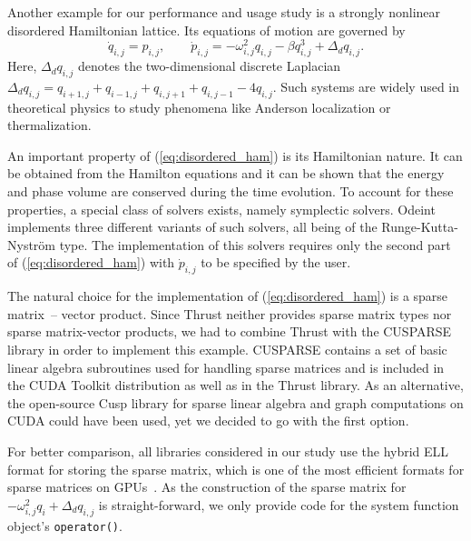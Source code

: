 \documentclass[final]{siamltex}
\newcommand{\code}[1]{\lstinline|#1|}
\newcommand{\eqref}[1]{(\ref{#1})}
\begin{document}
Another example for our performance and usage study is a strongly
nonlinear disordered Hamiltonian lattice. Its equations of motion are
governed by
\begin{equation}
\dot{q}_{i,j} = p_{i,j}, \quad \quad 
\dot{p}_{i,j} = - \omega_{i,j}^2 q_{i,j} - \beta q_{i,j}^3 + \Delta_d q_{i,j}.
\label{eq:disordered_ham}
\end{equation}
Here, $\Delta_d q_{i,j}$ denotes the two-dimensional discrete Laplacian
$\Delta_d
q_{i,j}=q_{i+1,j}+q_{i-1,j}+q_{i,j+1}+q_{i,j-1}-4q_{i,j}$. Such
systems are widely used in theoretical physics to study phenomena
like Anderson localization or thermalization.  %

An important property of \eqref{eq:disordered_ham} is its Hamiltonian
nature. It can be obtained from the Hamilton equations and it can be
shown that the energy and phase volume are conserved during the time
evolution. To account for these properties, a special class of solvers
exists, namely symplectic solvers. Odeint implements three different
variants of such solvers, all being of the Runge-Kutta-Nystr\"om
type. The implementation of this solvers requires only the second part
of \eqref{eq:disordered_ham} with $\dot{p}_{i,j}$ to be specified by
the user.



The natural choice for the implementation of \eqref{eq:disordered_ham} is a
sparse matrix~-- vector product. Since Thrust neither provides sparse
matrix types nor sparse matrix-vector products, we had to combine
Thrust with the CUSPARSE library in order to implement this example. CUSPARSE    %
contains a set of basic linear algebra subroutines used for handling sparse
matrices and is included in the CUDA Toolkit distribution as well as in the Thrust
library. As an alternative, the open-source Cusp library \cite{CuspRef} for sparse linear algebra
and graph computations on CUDA could have been used, yet we decided to go with the first option. %

For better comparison, all libraries considered in our study use the hybrid
ELL format for storing the sparse matrix, which is one of the most efficient
formats for sparse matrices on GPUs~\cite{BellGarland2008}.
As the construction of the sparse matrix for $- \omega_{i,j}^2 q_i + \Delta_d q_{i,j}$ is
straight-forward, we only provide code for the system function object's
\code{operator()}.
\end{document}
